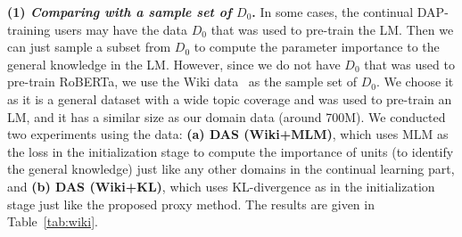 \documentclass{article} \usepackage{iclr2023_conference,times}
\begin{document}
{\color{black}

{\color{black}\textbf{(1) \textit{Comparing with a sample set of }$D_0$.}}
In some cases, the continual DAP-training users may have the data $D_0$ that was used to pre-train the LM. Then we can just sample a subset from $D_0$ to compute the parameter importance to the general knowledge in the LM. However, since we do not have $D_0$ that was used to pre-train RoBERTa, we use the Wiki data~\citep{DBLP:conf/iclr/MerityX0S17} as the sample set of $D_0$. We choose it as it is a general dataset with a wide topic coverage and was used to pre-train an LM, and it has a similar size as our domain data (around 700M). We conducted two experiments using the data: \textbf{(a) DAS (Wiki+MLM)}, which uses MLM as the loss in the initialization stage to compute the importance of units (to identify the general knowledge) just like any other domains in the continual learning part, and \textbf{(b) DAS (Wiki+KL)}, which uses KL-divergence as in the initialization stage just like the proposed proxy method. The results are given in Table~\ref{tab:wiki}. 



\begin{table*}[]
\centering
{}
\vspace{-3mm}
\caption{
{\color{black}Results for the Wiki dataset as the sample set of $D_0$ - average of 5 random seeds}
} 
\vspace{-4mm}
\label{tab:wiki}
\end{table*}
 
}
\end{document}
